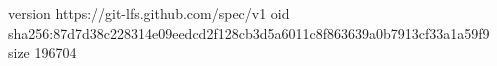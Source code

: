version https://git-lfs.github.com/spec/v1
oid sha256:87d7d38c228314e09eedcd2f128cb3d5a6011c8f863639a0b7913cf33a1a59f9
size 196704
